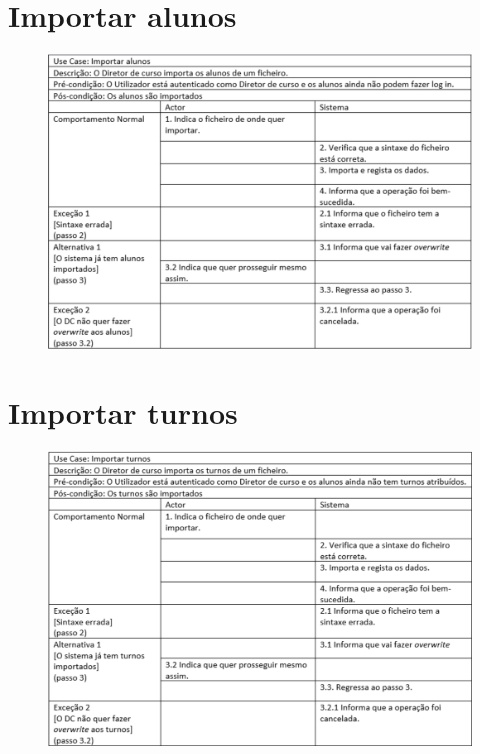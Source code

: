 \documentclass[12pt,a4paper]{report}
\begin{document}
\begin{appendices}
\section{Importar alunos}
\begin{figure}[H]
	\centering 
	\includegraphics[width=\textwidth]{modelacao/especificacao_use_case/importaralunos.png}  
\end{figure}

\section{Importar turnos}
\begin{figure}[H]
	\centering 
	\includegraphics[width=\textwidth]{modelacao/especificacao_use_case/importarturnos.png}  
\end{figure}


\end{appendices}
\end{document}
